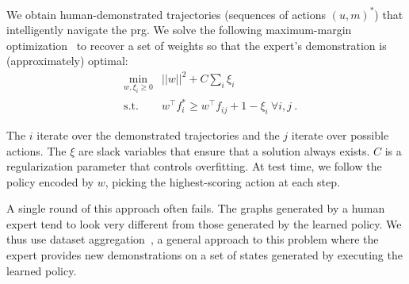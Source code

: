 We obtain human-demonstrated trajectories (sequences of actions $(u,
m)^{*}$) that intelligently navigate the {\sc prg}. We solve the
following maximum-margin optimization~\cite{taskar2005learning} to
recover a set of weights so that the expert's demonstration is
(approximately) optimal:
\begin{align*}
&\min_{w, \xi_i \geq 0} & ||w||^2 + C \sum_i \xi_i\\
&\text{s.t.} & w^{\top}f^*_i \geq w^{\top}f_{ij} + 1 - \xi_{i}\ \forall i, j \ .
\end{align*}

The $i$ iterate over the demonstrated trajectories and the $j$ iterate
over possible actions. The $\xi$ are slack variables that ensure that
a solution always exists. $C$ is a regularization parameter that
controls overfitting. At test time, we follow the policy encoded by
$w$, picking the highest-scoring action at each step.

A single round of this approach often fails. The graphs generated by a
human expert tend to look very different from those generated by
the learned policy. We thus use dataset
aggregation~\cite{dagger}, a general approach to this problem where
the expert provides new demonstrations on a set of states generated by
executing the learned policy.

